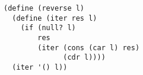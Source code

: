\documentclass[a4paper,12pt]{article}
\begin{document}
\begin{lstlisting}
(define (reverse l)
  (define (iter res l)
    (if (null? l)
        res
        (iter (cons (car l) res)
              (cdr l))))
  (iter '() l))
\end{lstlisting}
\end{document}

